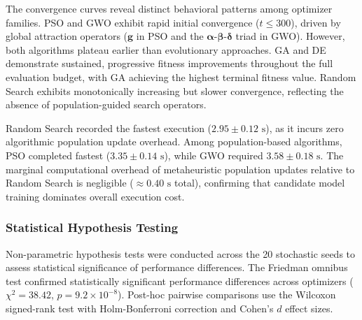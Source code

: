 The convergence curves reveal distinct behavioral patterns among optimizer families. PSO and GWO exhibit rapid initial convergence ($t \le 300$), driven by global attraction operators ($\bm{g}$ in PSO and the $\bm{\alpha}$-$\bm{\beta}$-$\bm{\delta}$ triad in GWO). However, both algorithms plateau earlier than evolutionary approaches. GA and DE demonstrate sustained, progressive fitness improvements throughout the full evaluation budget, with GA achieving the highest terminal fitness value. Random Search exhibits monotonically increasing but slower convergence, reflecting the absence of population-guided search operators.

Random Search recorded the fastest execution ($2.95 \pm 0.12\text{ s}$), as it incurs zero algorithmic population update overhead. Among population-based algorithms, PSO completed fastest ($3.35 \pm 0.14\text{ s}$), while GWO required $3.58 \pm 0.18\text{ s}$. The marginal computational overhead of metaheuristic population updates relative to Random Search is negligible ($\approx 0.40\text{ s}$ total), confirming that candidate model training dominates overall execution cost.

\subsubsection{Statistical Hypothesis Testing}

Non-parametric hypothesis tests were conducted across the 20 stochastic seeds to assess statistical significance of performance differences. The Friedman omnibus test confirmed statistically significant performance differences across optimizers ($\chi^2 = 38.42$, $p = 9.2 \times 10^{-8}$). Post-hoc pairwise comparisons use the Wilcoxon signed-rank test with Holm-Bonferroni correction and Cohen's $d$ effect sizes.


